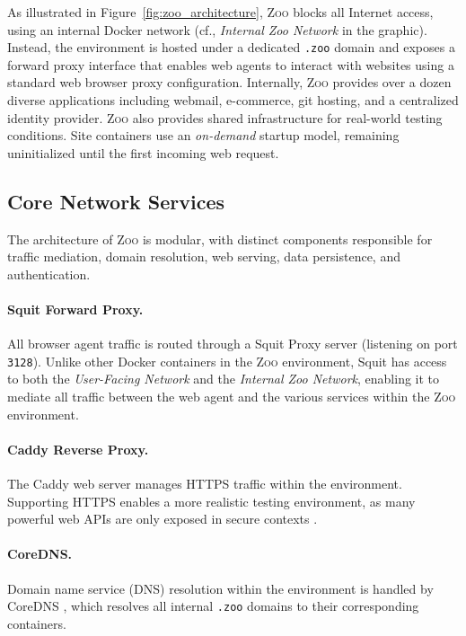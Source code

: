 \documentclass{article} %
\newcommand{\zoo}{\textsc{Zoo}}
\begin{document}
As illustrated in Figure~\ref{fig:zoo_architecture}, \zoo{} blocks all Internet access, using an internal Docker network \citep{docker_networking} (cf., \textit{Internal Zoo Network} in the graphic).
Instead, the environment is hosted under a dedicated \texttt{.zoo} domain and exposes a forward proxy interface that enables web agents to interact with websites using a standard web browser proxy configuration.
Internally, \zoo{} provides over a dozen diverse applications including webmail, e-commerce, git hosting, and a centralized identity provider.
\zoo{} also provides shared infrastructure for real-world testing conditions.
Site containers use an \textit{on-demand} startup model, remaining uninitialized until the first incoming web request.

\subsection{Core Network Services}
\label{sec:core_network_services}

The architecture of \zoo{} is modular, with distinct components responsible for traffic mediation, domain resolution, web serving, data persistence, and authentication.

\paragraph{Squit Forward Proxy.}
All browser agent traffic is routed through a Squit Proxy \citep{squit} server (listening on port \texttt{3128}).
Unlike other Docker containers in the \zoo{} environment, Squit has access to both the \textit{User-Facing Network} and the \textit{Internal Zoo Network}, enabling it to mediate all traffic between the web agent and the various services within the \zoo{} environment.

\paragraph{Caddy Reverse Proxy.}
The Caddy web server \citep{caddy} manages HTTPS traffic within the environment.
Supporting HTTPS enables a more realistic testing environment, as many powerful web APIs are only exposed in secure contexts \citep{w3c_secure_contexts}.

\paragraph{CoreDNS.}
Domain name service (DNS) resolution within the environment is handled by CoreDNS \citep{coredns}, which resolves all internal \texttt{.zoo} domains to their corresponding containers.
\end{document}
